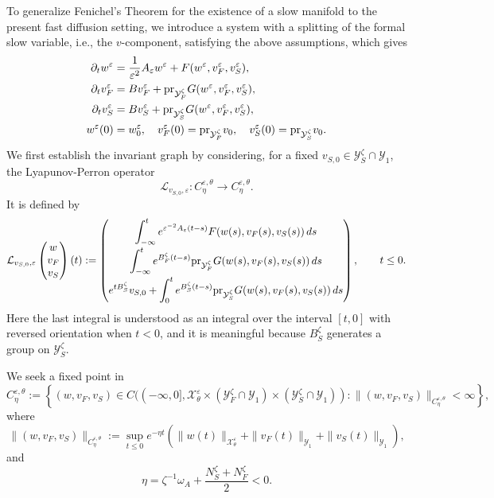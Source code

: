 \documentclass[11pt]{article}
\theoremstyle{definition}
\theoremstyle{remark}
\numberwithin{equation}{section}
\newcommand{\eps}{\varepsilon}
\newcommand{\mc}[1]{\mathcal{#1}}
\newcommand{\pr}{\textnormal{pr}}
\begin{document}
To generalize Fenichel's Theorem for the existence of a slow manifold  to the present fast diffusion setting,
we introduce a system with a splitting of the formal slow variable, i.e., the $v$-component, satisfying the above assumptions, which gives
\begin{align}\label{eq:fast diffusion system splitting}
    \begin{split}
        \partial_t w^\varepsilon &= \frac{1}{\varepsilon^2}A_\eps w^\varepsilon + F(w^\varepsilon,v_F^\varepsilon, v_S^\varepsilon),\\
        \partial_t v_F^\varepsilon &= B v_F^\varepsilon +\pr_{\mc Y_F^\zeta} G(w^\varepsilon,v_F^\varepsilon, v_S^\varepsilon),\\
        \partial_t v_S^\varepsilon &= B v_S^\varepsilon +\pr_{\mc Y_S^\zeta} G(w^\varepsilon,v_F^\varepsilon, v_S^\varepsilon),\\
        w^\varepsilon(0)&= w^\varepsilon_0,\quad  v^\varepsilon_F(0)= \pr_{\mc Y_F^\zeta} v_0,\quad v^\varepsilon_S(0)= \pr_{\mc Y_S^\zeta} v_0.
    \end{split}
\end{align}
We first establish the invariant graph by considering, for a fixed $v_{S,0}\in \mc Y_S^\zeta\cap \mc Y_1$,
the Lyapunov-Perron operator
\[
\mathcal L_{v_{S,0},\varepsilon}:C_\eta^{\varepsilon,\theta}\to
C_\eta^{\varepsilon,\theta}.
\]
It is defined by
\[
\mathcal L_{v_{S,0},\varepsilon}
\begin{pmatrix}
w\\ v_F\\ v_S
\end{pmatrix}
(t)
:=
\begin{pmatrix}
\displaystyle
\int_{-\infty}^t e^{\varepsilon^{-2}A_\varepsilon(t-s)}
F(w(s),v_F(s),v_S(s))\,ds
\\[3mm]
\displaystyle
\int_{-\infty}^t e^{B_F^\zeta(t-s)}
\pr_{\mc Y_F^\zeta}G(w(s),v_F(s),v_S(s))\,ds
\\[3mm]
\displaystyle
e^{tB_S^\zeta}v_{S,0}
+
\int_0^t e^{B_S^\zeta(t-s)}
\pr_{\mc Y_S^\zeta}G(w(s),v_F(s),v_S(s))\,ds
\end{pmatrix},
\qquad t\le0 .
\]
Here the last integral is understood as an integral over the interval
\([t,0]\) with reversed orientation when \(t<0\), and it is meaningful because
\(B_S^\zeta\) generates a group on \(\mc Y_S^\zeta\).

We seek a fixed point in
\[
C_\eta^{\varepsilon,\theta}
:=
\left\{
(w,v_F,v_S)\in C((-\infty,0],
\mc X_\theta^\varepsilon\times(\mc Y_F^\zeta\cap\mc Y_1)
\times(\mc Y_S^\zeta\cap\mc Y_1)):
\|(w,v_F,v_S)\|_{C_\eta^{\varepsilon,\theta}}<\infty
\right\},
\]
where
\[
\|(w,v_F,v_S)\|_{C_\eta^{\varepsilon,\theta}}
:=
\sup_{t\le0}e^{-\eta t}
\left(
\|w(t)\|_{\mc X_\theta^\varepsilon}
+\|v_F(t)\|_{\mc Y_1}
+\|v_S(t)\|_{\mc Y_1}
\right),
\]
and
\[
\eta=\zeta^{-1}\omega_A+\frac{N_S^\zeta+N_F^\zeta}{2}<0.
\]
\end{document}
